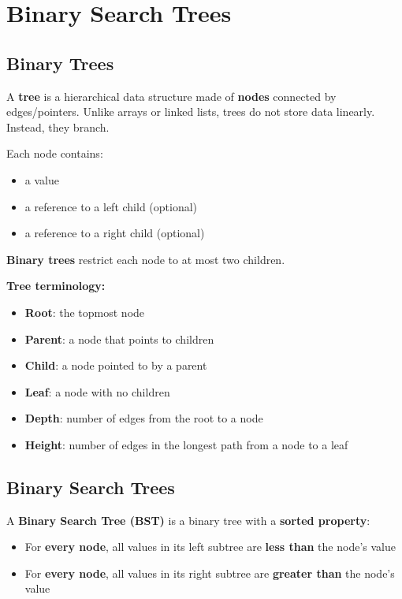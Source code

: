 \section{Binary Search Trees}

\subsection{Binary Trees}

A \textbf{tree} is a hierarchical data structure made of \textbf{nodes} connected by edges/pointers.  
Unlike arrays or linked lists, trees do not store data linearly. Instead, they branch.

Each node contains:
\begin{itemize}
  \item a value
  \item a reference to a left child (optional)
  \item a reference to a right child (optional)
\end{itemize}

\textbf{Binary trees} restrict each node to at most two children.

\textbf{Tree terminology:}
\begin{itemize}
  \item \textbf{Root}: the topmost node
  \item \textbf{Parent}: a node that points to children
  \item \textbf{Child}: a node pointed to by a parent
  \item \textbf{Leaf}: a node with no children
  \item \textbf{Depth}: number of edges from the root to a node
  \item \textbf{Height}: number of edges in the longest path from a node to a leaf
\end{itemize}

\subsection{Binary Search Trees}

A \textbf{Binary Search Tree (BST)} is a binary tree with a \textbf{sorted property}:
\begin{itemize}
  \item For \textbf{every node}, all values in its left subtree are \textbf{less than} the node's value
  \item For \textbf{every node}, all values in its right subtree are \textbf{greater than} the node's value
\end{itemize}

